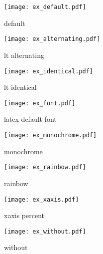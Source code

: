 \documentclass[9pt,twocolumn]{scrartcl}
\begin{document}
\begin{figure}
\texttt{[image: ex\_default.pdf]}
\caption{default}
\end{figure}

\begin{figure}
\texttt{[image: ex\_alternating.pdf]}
\caption{lt alternating}
\end{figure}

\begin{figure}
\texttt{[image: ex\_identical.pdf]}
\caption{lt identical}
\end{figure}

\begin{figure}
\texttt{[image: ex\_font.pdf]}
\caption{latex default font}
\end{figure}

\begin{figure}
\texttt{[image: ex\_monochrome.pdf]}
\caption{monochrome}
\end{figure}

\begin{figure}
\texttt{[image: ex\_rainbow.pdf]}
\caption{rainbow}
\end{figure}

\begin{figure}
\texttt{[image: ex\_xaxis.pdf]}
\caption{xaxis percent}
\end{figure}

\begin{figure}
\texttt{[image: ex\_without.pdf]}
\caption{without}
\end{figure}
\end{document}
